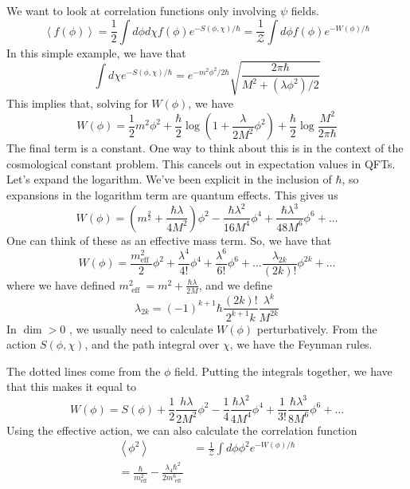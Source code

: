 \documentclass[11pt, oneside]{article}   	%
\theoremstyle{slanted}
\begin{document}
We want to look at correlation 
functions only involving $ \psi $ fields. 
\[
	\left< f ( \phi )  \right>  = \frac{1}{2
	} \int d \phi d \chi f \left( \phi  \right)  e ^{  - S \left( 
\phi , \chi  \right)  / \hbar  }  = \frac{1}{\mathcal{ Z } } 
\int d \phi f \left( \phi  \right)  e ^{  - W \left( \phi  \right)  / \hbar }
\]  In this simple example, we 
have that 
\[
	\int d \chi e ^{  - S \left( \phi , \chi  \right)  / \hbar } 
	 = e ^{  - m ^ 2 \phi ^ 2  / 2 \hbar } \sqrt{ \frac{2 \pi \hbar }{ 
	 M ^ 2 + \left( \lambda \phi ^ 2  \right)   / 2 }} 
\]  This implies that, 
solving for $ W \left( \phi  \right)  $, 
we have 
\[
 W \left( \phi  \right)   = \frac{1}{2 } m ^ 2 \phi ^ 2  + 
 \frac{\hbar}{2 } \log \left( 1 + \frac{ \lambda }{ 2 M^ 2 } \phi ^ 2   \right)  
 + \frac{\hbar}{2 } \log \frac{ M ^ 2 }{ 2 \pi \hbar } 
\] The final term is a constant. 
One way to think about this 
is in the context of the cosmological 
constant problem. 
This cancels out in expectation 
values in QFTs. 
Let's expand the logarithm. 
We've been explicit in the inclusion of 
$ \hbar $, so expansions in the logarithm 
term are quantum effects. 
This gives us 
\[
 W \left( \phi  \right)   = 
 \left( m ^ \frac{2}{ 2 } + \frac{\hbar \lambda }{ 4 M ^ 2 }  \right)  \phi ^ 2 
  - \frac{\hbar \lambda ^ 2 }{ 16 M ^ 4 } \phi ^ 4 + 
  \frac{ \hbar \lambda ^ 3 }{ 48 M ^ 6} \phi ^ 6 + \dots 
\]One 
can think of these as an effective 
mass term. So, we have that 
\[
  W\left( \phi  \right)   = 
  \frac{ m _{ \text{eff } } ^ 2 }{ 2 } \phi ^ 2 + \frac{ \lambda ^ 4 }{ 4 ! } 
  \phi ^ 4 + \frac{ \lambda ^ 6  }{6  ! } \phi ^ 6 + \dots \frac{ \lambda _{ 2k } }{ \left( 2k  \right)  ! } \phi ^{ 2k } + \dots 
\] where we have defined $ m_{ \text{ eff } } ^ 2  = m ^   2 + 
\frac{\hbar \lambda }{ 2 M } $, 
and we define 
\[
	\lambda _{ 2k }  = \left( - 1  \right) ^{ k + 1 } \hbar 
	\frac{ \left(  2k  \right)  ! }{ 2 ^{ k + 1 } k } \frac{\lambda ^ k }{ M ^{ 2 k }}
\] In $ \dim > 0  $ , we 
usually need to calculate 
$ W \left( \phi  \right)  $ perturbatively. 
From the action $ S( \phi , \chi ) $, 
and the path integral over $ \chi $, 
we have the Feynman rules. 

The dotted lines come from the $ \phi $ field. 
Putting the integrals 
together, we have that 
this makes it equal to 
\[
	W \left( \phi  \right)   = S \left( \phi  \right)  
	+ \frac{1}{2 } \frac{ h \lambda }{ 2 M ^ 2 }\phi ^ 2  - 
	\frac{1}{4 } \frac{ \hbar \lambda ^ 2 }{ 4 M ^ 4 } \phi ^ 4 
	+  \frac{1}{3 ! } \frac{ \hbar \lambda ^ 3 }{ 8 M ^ 6 } \phi ^ 6 + \dots 
\]  
Using the effective action, 
we can also calculate the correlation 
function 
\begin{align*}
	\left< \phi ^ 2  \right> &=  \frac{1}{ \mathcal{ Z } } 
	\int d \phi \phi ^ 2 e ^{  - W \left( \phi  \right)   / \hbar  }\\
	 = \frac{ \hbar  }{ m _{ \text{eff} }^ 2  } - \frac{ \lambda _ 4 \hbar ^ 2 }{2 
	 m _{ \text{ eff } } ^ 6 }
\end{align*}
\end{document}
